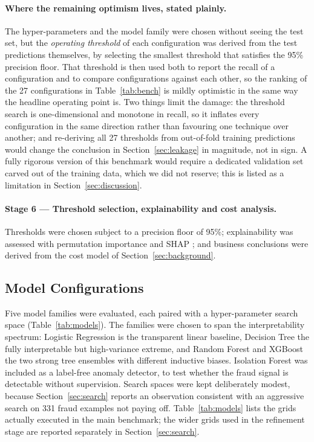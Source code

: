 \paragraph{Where the remaining optimism lives, stated plainly.} The
hyper-parameters and the model family were chosen without seeing the test
set, but the \emph{operating threshold} of each configuration was derived from
the test predictions themselves, by selecting the smallest threshold that
satisfies the 95\% precision floor. That threshold is then used both to report
the recall of a configuration and to compare configurations against each
other, so the ranking of the 27 configurations in Table~\ref{tab:bench} is
mildly optimistic in the same way the headline operating point is. Two things
limit the damage: the threshold search is one-dimensional and monotone in
recall, so it inflates every configuration in the same direction rather than
favouring one technique over another; and re-deriving all 27 thresholds from
out-of-fold training predictions would change the conclusion in
Section~\ref{sec:leakage} in magnitude, not in sign. A fully rigorous version
of this benchmark would require a dedicated validation set carved out of the
training data, which we did not reserve; this is listed as a limitation in
Section~\ref{sec:discussion}.

\paragraph*{Stage 6 --- Threshold selection, explainability and cost analysis.}
Thresholds were chosen subject to a precision floor of 95\%; explainability was
assessed with permutation importance and SHAP \cite{Lundberg2020}; and business
conclusions were derived from the cost model of Section~\ref{sec:background}.

\subsection{Model Configurations}

Five model families were evaluated, each paired with a hyper-parameter search
space (Table~\ref{tab:models}). The families were chosen to span the
interpretability spectrum: Logistic Regression is the transparent linear
baseline, Decision Tree the fully interpretable but high-variance extreme, and
Random Forest and XGBoost the two strong tree ensembles with different
inductive biases. Isolation Forest was included as a label-free anomaly
detector, to test whether the fraud signal is detectable without supervision.
Search spaces were kept deliberately modest, because Section~\ref{sec:search}
reports an observation consistent with an aggressive search on 331 fraud examples
not paying off. Table~\ref{tab:models} lists the grids actually executed in the
main benchmark; the wider grids used in the refinement stage are reported
separately in Section~\ref{sec:search}.

